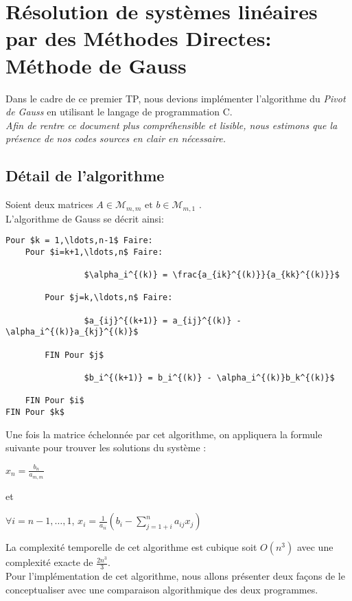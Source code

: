 \chapter{Résolution de systèmes linéaires par des Méthodes Directes: Méthode de Gauss}
Dans le cadre de ce premier TP, nous devions implémenter l'algorithme du \emph{Pivot de Gauss} en utilisant le langage de programmation C.\\
\textit{Afin de rentre ce document plus compréhensible et lisible, nous estimons que la présence de nos codes sources en clair en nécessaire.} \\
\section{Détail de l'algorithme}
Soient deux matrices $A \in \mathcal{M}_{m,m} \text{ et  } b \in \mathcal{M}_{m,1}$ . \\
L'algorithme de Gauss se décrit ainsi: \\
\begin{lstlisting}[mathescape=true, frame=single]
Pour $k = 1,\ldots,n-1$ Faire:
	Pour $i=k+1,\ldots,n$ Faire:

				$\alpha_i^{(k)} = \frac{a_{ik}^{(k)}}{a_{kk}^{(k)}}$ 
		
		Pour $j=k,\ldots,n$ Faire:

		   		$a_{ij}^{(k+1)} = a_{ij}^{(k)} - \alpha_i^{(k)}a_{kj}^{(k)}$
	
		FIN Pour $j$

				$b_i^{(k+1)} = b_i^{(k)} - \alpha_i^{(k)}b_k^{(k)}$

	FIN Pour $i$
FIN Pour $k$
\end{lstlisting}
\newpage
Une fois la matrice échelonnée par cet algorithme, on appliquera la formule suivante pour trouver les solutions du système : \\
\begin{mdframed}
\begin{center}
\begin{large}
$ x_n = \frac{b_n}{a_{m,m}}$ \\
\end{large}
\end{center}
et \\
\begin{center}
\begin{large}
$ \forall i = n-1, \ldots, 1$, $x_i = \frac{1}{a_{ii}}\left( b_i-\sum\limits_{j=1+i}^n a_{ij}x_j \right)$\\
\end{large}
\end{center}
\end{mdframed}
La complexité temporelle de cet algorithme est cubique soit $O(n^3)$ avec une complexité exacte de $\frac{2n^3}{3}$. \\
Pour l'implémentation de cet algorithme, nous allons présenter deux façons de le conceptualiser avec une comparaison algorithmique des deux programmes. \\
